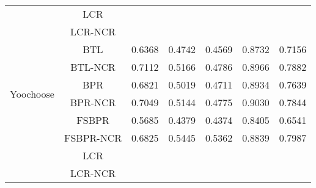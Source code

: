 \documentclass[letterpaper]{article} %
\begin{document}
\begin{table}[htp]
\begin{center}
\begin{tabular}{|c|c|c|c|c|c|c|}
   & LCR & & & & & \\\cline{2-7}
 & LCR-NCR & & & & & \\\hline
\multirow{6}{*}{Yoochoose} & BTL &0.6368 &0.4742 &0.4569 &0.8732 &0.7156 \\\cline{2-7}
 & BTL-NCR &0.7112 &0.5166 &0.4786 &0.8966 &0.7882 \\\cline{2-7}
 & BPR &0.6821 &0.5019 &0.4711 &0.8934 &0.7639 \\\cline{2-7}
 & BPR-NCR &0.7049 &0.5144 &0.4775 &0.9030 &0.7844 \\\cline{2-7}
 & FSBPR &0.5685 &0.4379 &0.4374 &0.8405 &0.6541\\\cline{2-7}
  & FSBPR-NCR &0.6825 &0.5445 &0.5362 &0.8839 &0.7987  \\\cline{2-7}
   & LCR & & & & & \\\cline{2-7}
 & LCR-NCR & & & & & \\\hline
\end{tabular}
\end{center}
\label{tab:ratingresult}
\end{table}%
\end{document}
